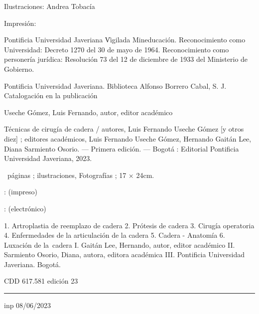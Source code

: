       Ilustraciones:\crlf
      Andrea Tobacía

      \blank[halfline]

      Impresión:\crlf

      \blank[2*big]

      Pontificia Universidad Javeriana \| Vigilada Mineducación. Reconocimiento como Universidad: Decreto 1270 del 30 de mayo de 1964. Reconocimiento como personería jurídica: Resolución 73 del 12 de diciembre de 1933 del Ministerio de Gobierno.
    \stopxcell
  \stopxrow
\stopxtable

\vfill

\startframed[offset=1em,width=local,align={width,nothyphenated,verytolerant}]
\switchtobodyfont[7pt]
\start{}Pontiﬁcia Universidad Javeriana. Biblioteca Alfonso Borrero Cabal, S. J.\crlf
Catalogación en la publicación\par\stop

\blank[big]

Useche Gómez, Luis Fernando, autor, editor académico

Técnicas de cirugía de cadera / autores, Luis Fernando Useche Gómez {[}y otros diez{]} ; editores académicos, Luis Fernando Useche Gómez, Hernando Gaitán Lee, Diana Sarmiento Osorio. --- Primera edición. --- Bogotá : Editorial Pontificia Universidad Javeriana, 2023.

\blank[big]

\totalnumberofpages~páginas ; ilustraciones, Fotografías ; 17 × 24cm.

:  (impreso)

:  (electrónico)

\blank[big]

1. Artroplastia de reemplazo de cadera 2. Prótesis de cadera 3. Cirugía operatoria 4. Enfermedades de la articulación de la cadera 5. Cadera - Anatomía 6. Luxación de la~cadera I. Gaitán Lee, Hernando, autor, editor académico II. Sarmiento Osorio, Diana, autora, editora académica III. Pontificia Universidad Javeriana. Bogotá.

\blank[big]

CDD 617.581 edición 23

\blank[big]

\hrule

\blank[small]

inp \hfill 08/06/2023
\stopframed

\stopmakeup
